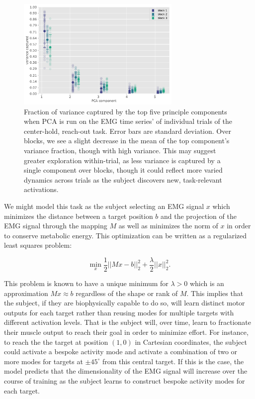 \documentclass[
  a4paper,
]{article}
\begin{document}
\begin{figure}
\hypertarget{fig:PCA_trial_variance}{%
\centering
\includegraphics[width=0.7\textwidth,height=\textheight]{images/data_analysis/center_hold/PCA_trial_variance.pdf}
\caption{Fraction of variance captured by the top five principle
components when PCA is run on the EMG time series' of individual trials
of the center-hold, reach-out task. Error bars are standard deviation.
Over blocks, we see a slight decrease in the mean of the top component's
variance fraction, though with high variance. This may suggest greater
exploration within-trial, as less variance is captured by a single
component over blocks, though it could reflect more varied dynamics
across trials as the subject discovers new, task-relevant
activations.}\label{fig:PCA_trial_variance}
}
\end{figure}

We might model this task as the subject selecting an EMG signal \(x\)
which minimizes the distance between a target position \(b\) and the
projection of the EMG signal through the mapping \(M\) as well as
minimizes the norm of \(x\) in order to conserve metabolic energy. This
optimization can be written as a regularized least squares problem:

\[
\min_x\frac{1}{2}||Mx - b||^2_2 + \frac{\lambda}{2}||x||_2^2.
\]

This problem is known to have a unique minimum for \(\lambda>0\) which
is an approximation \(Mx\approx b\) regardless of the shape or rank of
\(M\). This implies that the subject, if they are biophysically capable
to do so, will learn distinct motor outputs for each target rather than
reusing modes for multiple targets with different activation levels.
That is the subject will, over time, learn to fractionate their muscle
output to reach their goal in order to minimize effort. For instance, to
reach the the target at position \((1,0)\) in Cartesian coordinates, the
subject could activate a bespoke activity mode and activate a
combination of two or more modes for targets at \(\pm45^\circ\) from
this central target. If this is the case, the model predicts that the
dimensionality of the EMG signal will increase over the course of
training as the subject learns to construct bespoke activity modes for
each target.
\end{document}
